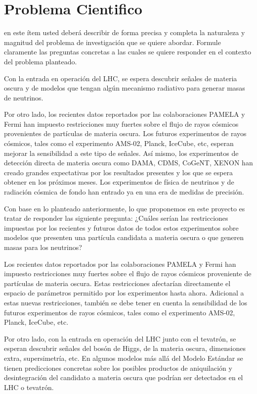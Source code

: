 \section{Problema Cientifico}	
\begin{instrucciones}
  en este ítem usted deberá describir de forma
precisa y completa la naturaleza y magnitud del problema de investigación que se quiere
abordar. Formule claramente las preguntas concretas a las cuales se quiere responder en el
contexto del problema planteado.
\end{instrucciones}


Con la entrada en operación del LHC, se espera descubrir señales de materia oscura y de modelos que tengan algún mecanismo radiativo para generar masas de neutrinos.

Por otro lado, los recientes datos reportados por las colaboraciones PAMELA y Fermi han impuesto restricciones muy fuertes sobre el flujo de rayos cósmicos provenientes de partículas de materia oscura. Los futuros experimentos de rayos cósmicos, tales como el experimento AMS-02, Planck, IceCube, etc, esperan mejorar la sensibilidad a este tipo de señales. Así mismo, los experimentos de detección directa de materia oscura como DAMA, CDMS, CoGeNT, XENON han creado grandes expectativas por los resultados presentes y los que se espera obtener en los próximos meses. Los experimentos de física de neutrinos y de radiación cósmica de fondo han entrado ya en una era de medidas de precisión.

Con base en lo planteado anteriormente, lo que proponemos en este proyecto es tratar de responder las siguiente pregunta: ¿Cuáles serían las restricciones impuestas por los recientes y futuros datos de todos estos experimentos sobre  modelos que presenten una partícula candidata a materia oscura o que generen masas para los neutrinos?

\newpage{}
Los recientes datos reportados por las colaboraciones PAMELA y Fermi han impuesto restricciones muy fuertes sobre el flujo de rayos cósmicos proveniente de partículas de materia oscura. Estas restricciones afectarían directamente el espacio de parámetros permitido por los experimentos hasta ahora. Adicional a estas nuevas restricciones, también se debe tener en cuenta la sensibilidad de los futuros experimentos de rayos cósmicos, tales como el experimento AMS-02, Planck, IceCube, etc.

Por otro lado, con la entrada en operación del LHC junto con el tevatrón, se esperan descubrir señales del bosón de Higgs, de la materia oscura, dimensiones extra, supersimetría, etc. En algunos modelos más allá del Modelo Estándar se tienen predicciones concretas sobre los posibles productos de aniquilación y desintegración del candidato a materia oscura que podrían ser detectados en el LHC o tevatrón.

